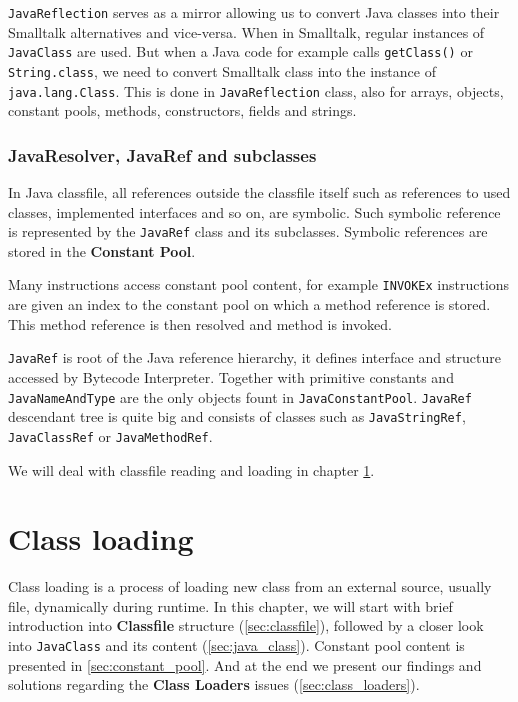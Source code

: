 \documentclass[11pt,twoside,a4paper]{book}
\let\Chapter\chapter
\def\chapter{\addtocontents{lol}{\protect\addvspace{10pt}}\Chapter}
\begin{document}
\texttt{JavaReflection} serves as a mirror allowing us to convert Java classes into their Smalltalk alternatives and vice-versa. 
When in Smalltalk, regular instances of \texttt{JavaClass} are used. 
But when a Java code for example calls \texttt{getClass()} or \texttt{String.class}, we need to convert Smalltalk class into the instance of \texttt{java.lang.Class}. 
This is done in \texttt{JavaReflection} class, also for arrays, objects, constant pools, methods, constructors, fields and strings.

\subsection{JavaResolver, JavaRef and subclasses}

In Java classfile, all references outside the classfile itself such as references to used classes, implemented interfaces and so on, are symbolic.\cite[chapter~4]{vmspec}
Such symbolic reference is represented by the \texttt{JavaRef} class and its subclasses. 
Symbolic references are stored in the \textbf{Constant Pool}.

Many instructions access constant pool content, for example \texttt{INVOKEx} instructions are given an index to the constant pool on which a method reference is stored.
This method reference is then resolved and method is invoked.

\texttt{JavaRef} is root of the Java reference hierarchy, it defines interface and structure accessed by Bytecode Interpreter. 
Together with primitive constants and \texttt{JavaNameAndType} are the only objects fount in \texttt{JavaConstantPool}. 
\texttt{JavaRef} descendant tree is quite big and consists of classes such as \texttt{JavaStringRef}, \texttt{JavaClassRef} or \texttt{JavaMethodRef}. 

We will deal with classfile reading and loading in chapter \ref{chap:loading}.

\chapter{Class loading}
\label{chap:loading}

Class loading is a process of loading new class from an external source, usually file, dynamically during runtime.
In this chapter, we will start with brief introduction into \textbf{Classfile} structure (\ref{sec:classfile}), followed by a closer look into \texttt{JavaClass} and its content (\ref{sec:java_class}).
Constant pool content is presented in \ref{sec:constant_pool}.
And at the end we present our findings and solutions regarding the \textbf{Class Loaders} issues (\ref{sec:class_loaders}).
\end{document}
